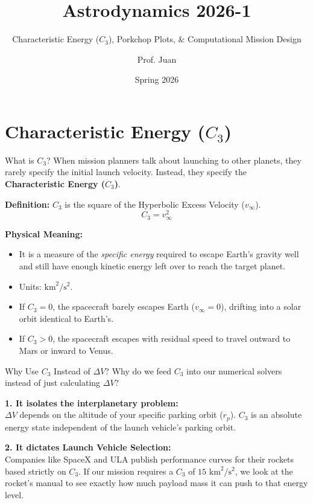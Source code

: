 \documentclass[11pt]{beamer}
\title[Porkchop Plots \& NASA SPICE]{Astrodynamics 2026-1}
\subtitle{Characteristic Energy ($C_3$), Porkchop Plots, \& Computational Mission Design}
\author{Prof. Juan}
\institute{Universidad de Antioquia - Aerospace Engineering}
\date{Spring 2026}
\begin{document}
\begin{frame}
    \titlepage
\end{frame}

\section{Characteristic Energy ($C_3$)}

\begin{frame}{What is $C_3$?}
    When mission planners talk about launching to other planets, they rarely specify the initial launch velocity. Instead, they specify the \textbf{Characteristic Energy ($C_3$)}.
    
    \vspace{0.3cm}
    \textbf{Definition:} $C_3$ is the square of the Hyperbolic Excess Velocity ($v_\infty$).
    \begin{equation}
        C_3 = v_\infty^2
    \end{equation}
    
    \textbf{Physical Meaning:}
    \begin{itemize}
        \item It is a measure of the \textit{specific energy} required to escape Earth's gravity well and still have enough kinetic energy left over to reach the target planet.
        \item Units: $\text{km}^2/\text{s}^2$.
        \item If $C_3 = 0$, the spacecraft barely escapes Earth ($v_\infty = 0$), drifting into a solar orbit identical to Earth's.
        \item If $C_3 > 0$, the spacecraft escapes with residual speed to travel outward to Mars or inward to Venus.
    \end{itemize}
\end{frame}

\begin{frame}{Why Use $C_3$ Instead of $\Delta V$?}
    Why do we feed $C_3$ into our numerical solvers instead of just calculating $\Delta V$?
    
    \vspace{0.3cm}
    \textbf{1. It isolates the interplanetary problem:} \\
    $\Delta V$ depends on the altitude of your specific parking orbit ($r_p$). $C_3$ is an absolute energy state independent of the launch vehicle's parking orbit. 
    
    \vspace{0.3cm}
    \textbf{2. It dictates Launch Vehicle Selection:} \\
    Companies like SpaceX and ULA publish performance curves for their rockets based strictly on $C_3$. If our mission requires a $C_3$ of $15 \text{ km}^2/\text{s}^2$, we look at the rocket's manual to see exactly how much payload mass it can push to that energy level.
\end{frame}
\end{document}
